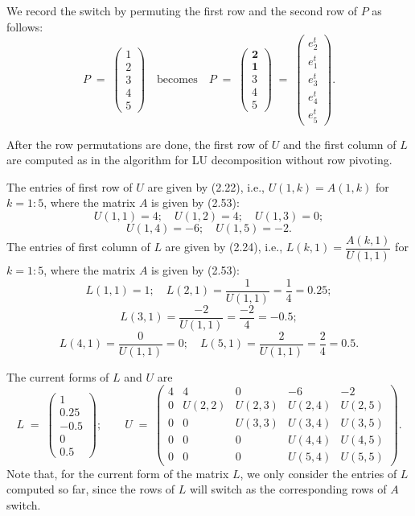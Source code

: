 We record the switch by permuting the first row and the second row of $P$ as
follows:
\begin{equation}
P \;=\; \begin{pmatrix} 1\\ 2\\ 3\\ 4\\ 5\end{pmatrix}
\quad \text{becomes} \quad
P \;=\; \begin{pmatrix} \mathbf{2}\\ \mathbf{1}\\ 3\\ 4\\ 5\end{pmatrix}
\;=\;
\begin{pmatrix} e_2^t\\ e_1^t\\ e_3^t\\ e_4^t\\ e_5^t\end{pmatrix}.
\end{equation}

After the row permutations are done, the first row of $U$ and the first column of
$L$ are computed as in the algorithm for LU decomposition without row pivoting.

The entries of first row of $U$ are given by (2.22), i.e., $U(1,k) = A(1,k)$ for
$k=1:5$, where the matrix $A$ is given by (2.53):
\[
U(1,1) = 4;\quad U(1,2) = 4;\quad U(1,3) = 0;
\]
\[
U(1,4) = -6;\quad U(1,5) = -2.
\]
The entries of first column of $L$ are given by (2.24), i.e., $L(k,1) =
\dfrac{A(k,1)}{U(1,1)}$ for $k=1:5$, where the matrix $A$ is given by (2.53):
\[
L(1,1) = 1;\quad L(2,1) = \frac{1}{U(1,1)} = \frac{1}{4} = 0.25;
\]
\[
L(3,1) = \frac{-2}{U(1,1)} = \frac{-2}{4} = -0.5;
\]
\[
L(4,1) = \frac{0}{U(1,1)} = 0;\quad L(5,1) = \frac{2}{U(1,1)} = \frac{2}{4} = 0.5.
\]

The current forms of $L$ and $U$ are
\begin{equation}
L \;=\; \begin{pmatrix} 1\\ 0.25\\ -0.5\\ 0\\ 0.5\end{pmatrix};
\qquad
U \;=\; \begin{pmatrix}
4 & 4 & 0 & -6 & -2\\
0 & U(2,2) & U(2,3) & U(2,4) & U(2,5)\\
0 & 0 & U(3,3) & U(3,4) & U(3,5)\\
0 & 0 & 0 & U(4,4) & U(4,5)\\
0 & 0 & 0 & U(5,4) & U(5,5)
\end{pmatrix}.
\end{equation}
Note that, for the current form of the matrix $L$, we only consider the entries of
$L$ computed so far, since the rows of $L$ will switch as the corresponding rows of
$A$ switch.

